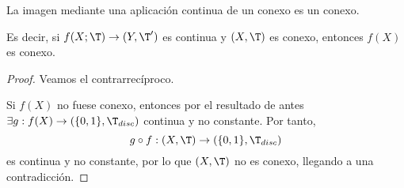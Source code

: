 \begin{teo}
    La imagen mediante una aplicación continua de un conexo es un conexo.
    
    Es decir, si $f(X;\T)\to (Y,\T')$ es continua y $(X,\T)$ es conexo, entonces $f(X)$ es conexo.
\end{teo}
\begin{proof}
    Veamos el contrarrecíproco.
    
    Si $f(X)$ no fuese conexo, entonces por el resultado de antes $\exists g:f(X)\to \left(\{0,1\},\T_{disc}\right)$ continua y no constante. Por tanto,
    \begin{equation*}
        g\circ f:(X,\T)\to \left(\{0,1\},\T_{disc}\right)
    \end{equation*}
    es continua y no constante, por lo que $(X,\T)$ no es conexo, llegando a una contradicción.
\end{proof}


